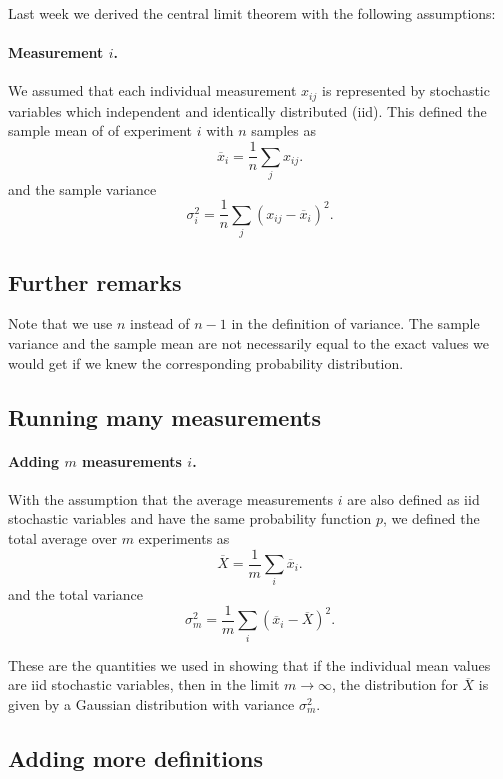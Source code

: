 \documentclass[%
oneside,                 %
final,                   %
10pt]{article}
\begin{document}
Last week we derived the central limit theorem with the following assumptions:


\paragraph{Measurement $i$.}
We assumed that each individual measurement $x_{ij}$ is represented by stochastic variables which independent and identically distributed (iid).
This defined the sample mean of of experiment $i$ with $n$ samples as
\[
\overline{x}_i=\frac{1}{n}\sum_{j} x_{ij}.
\]
and the sample variance
\[
\sigma^2_i=\frac{1}{n}\sum_{j} \left(x_{ij}-\overline{x}_i\right)^2.
\]



\subsection{Further remarks}

Note that we use $n$ instead of $n-1$ in the definition of
variance. The sample variance and the sample mean are not necessarily equal to
the exact values we would get if we knew the corresponding probability
distribution.

\subsection{Running many measurements}


\paragraph{Adding $m$ measurements $i$.}
With the assumption that the average measurements $i$ are also defined as  iid stochastic variables and have the same probability function $p$,
we defined the total average over $m$ experiments as
\[
\overline{X}=\frac{1}{m}\sum_{i} \overline{x}_{i}.
\]
and the total variance
\[
\sigma^2_{m}=\frac{1}{m}\sum_{i} \left( \overline{x}_{i}-\overline{X}\right)^2.
\]


These are the quantities we used in showing that if the individual mean values are iid stochastic variables, then in the limit $m\rightarrow \infty$, the distribution for $\overline{X}$ is given by a Gaussian distribution with variance $\sigma^2_m$.

\subsection{Adding more definitions}
\end{document}
